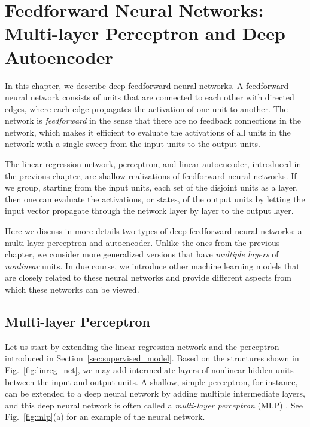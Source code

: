 \documentclass[dissertation,nocontribution,draft*]{aaltoseries}
\begin{document}
\chapter{Feedforward Neural Networks: \\{\small Multi-layer
Perceptron and Deep Autoencoder}}
\label{chap:ffnn}

In this chapter, we describe deep feedforward neural
networks. A feedforward neural network consists of units
that are connected to each other with directed edges, where
each edge propagates the activation of one unit to another.
The network is \textit{feedforward} in the sense that there
are no feedback connections in the network, which makes it
efficient to evaluate the activations of all units in the
network with a single sweep from the input units to the
output units.

The linear regression network, perceptron, and linear
autoencoder, introduced in the previous chapter, are shallow
realizations of feedforward neural networks.  If we group,
starting from the input units, each set of the disjoint
units as a layer, then one can evaluate the activations, or
states, of the output units by letting the input vector
propagate through the network layer by layer to the output
layer.

Here we discuss in more details two types of deep
feedforward neural networks: a multi-layer
perceptron and autoencoder. Unlike the ones from the
previous chapter, we consider more generalized versions that
have \textit{multiple layers} of \textit{nonlinear} units.
In due course, we introduce other machine learning models
that are closely related to these neural networks and
provide different aspects from which these networks can be
viewed.

\section{Multi-layer Perceptron}
\label{sec:mlp}

Let us start by extending the linear regression network and
the
perceptron introduced in Section~\ref{sec:supervised_model}.
Based on the structures shown in Fig.~\ref{fig:linreg_net},
we may add intermediate layers of nonlinear hidden units
between the input and output units. A shallow, simple
perceptron, for instance, can be extended to a deep neural
network by adding multiple intermediate layers, and this
deep neural network is often called a \textit{multi-layer
perceptron} (MLP)
\citep{Rosenblatt1962}. See
Fig.~\ref{fig:mlp}(a) for an example of the neural network.
\end{document}
